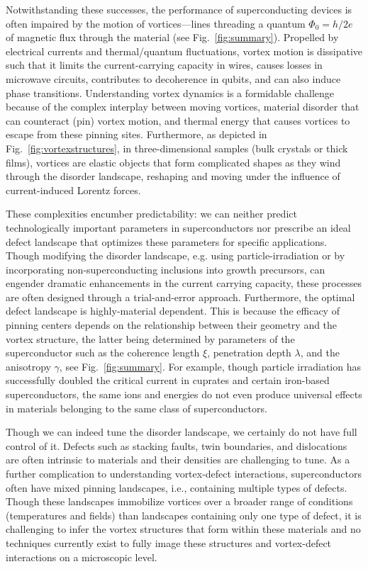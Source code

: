 \documentclass[%
 aip,
 amsmath,amssymb,
 reprint,%
floatfix]{revtex4-1}
\begin{document}
Notwithstanding these successes, the performance of superconducting devices is often impaired by the motion of vortices---lines threading a quantum $\Phi_{0} = h / 2e$ of magnetic flux through the material (see Fig.~\ref{fig:summary}). Propelled by electrical currents and thermal/quantum fluctuations, vortex motion is dissipative such that it limits the current-carrying capacity in wires, causes losses in microwave circuits, contributes to decoherence in qubits, and can also induce phase transitions.  Understanding vortex dynamics is a formidable challenge because of the complex interplay between moving vortices, material disorder that can counteract (pin) vortex motion, and thermal energy that causes vortices to escape from these pinning sites. Furthermore, as depicted in Fig.~\ref{fig:vortexstructures}, in three-dimensional samples (bulk crystals or thick films), vortices are elastic objects that form complicated shapes as they wind through the disorder landscape, reshaping and moving under the influence of current-induced Lorentz forces.



These complexities encumber predictability: we can neither predict technologically important parameters in superconductors nor prescribe an ideal defect landscape that optimizes these parameters for specific applications.  Though modifying the disorder landscape, e.g. using particle-irradiation or by incorporating non-superconducting inclusions into growth precursors, can engender dramatic enhancements in the current carrying capacity, these processes are often designed through a trial-and-error approach.  Furthermore, the optimal defect landscape is highly-material dependent. This is because the efficacy of pinning centers depends on the relationship between their geometry and the vortex structure, the latter being determined by parameters of the superconductor such as the coherence length $\xi$, penetration depth $\lambda$, and the anisotropy $\gamma$, see Fig.~\ref{fig:summary}.  For example, though particle irradiation has successfully doubled the critical current in cuprates and certain iron-based superconductors, the same ions and energies do not even produce universal effects in materials belonging to the same class of superconductors\cite{Tamegai2012}.





Though we can indeed tune the disorder landscape, we certainly do not have full control of it.  Defects such as stacking faults, twin boundaries, and dislocations are often intrinsic to materials and their densities are challenging to tune. As a further complication to understanding vortex-defect interactions, superconductors often have mixed pinning landscapes, i.e., containing multiple types of defects. Though these landscapes immobilize vortices over a broader range of conditions (temperatures and fields) than landscapes containing only one type of defect, it is challenging to infer the vortex structures that form within these materials and no techniques currently exist to fully image these structures and vortex-defect interactions on a microscopic level.
\end{document}
